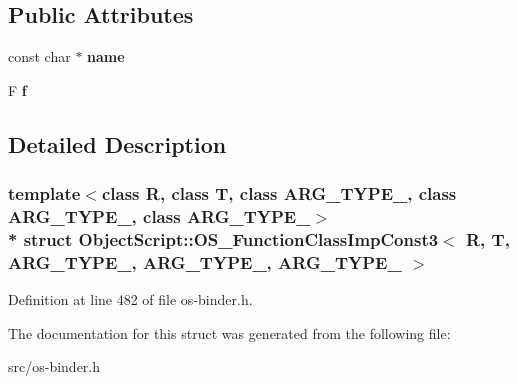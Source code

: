 \subsection*{Public Attributes}
\begin{DoxyCompactItemize}
\item 
const char $\ast$ {\bfseries name}\hypertarget{struct_object_script_1_1_o_s___function_class_imp_const3_a222b6003358fb38b0bf01ca60906c4cc}{}\label{struct_object_script_1_1_o_s___function_class_imp_const3_a222b6003358fb38b0bf01ca60906c4cc}

\item 
F {\bfseries f}\hypertarget{struct_object_script_1_1_o_s___function_class_imp_const3_a1505dd132cf97d86646e6d83f7d48a16}{}\label{struct_object_script_1_1_o_s___function_class_imp_const3_a1505dd132cf97d86646e6d83f7d48a16}

\end{DoxyCompactItemize}


\subsection{Detailed Description}
\subsubsection*{template$<$class R, class T, class A\+R\+G\+\_\+\+T\+Y\+P\+E\+\_, class A\+R\+G\+\_\+\+T\+Y\+P\+E\+\_, class A\+R\+G\+\_\+\+T\+Y\+P\+E\+\_$>$\\*
struct Object\+Script\+::\+O\+S\+\_\+\+Function\+Class\+Imp\+Const3$<$ R, T, A\+R\+G\+\_\+\+T\+Y\+P\+E\+\_, A\+R\+G\+\_\+\+T\+Y\+P\+E\+\_, A\+R\+G\+\_\+\+T\+Y\+P\+E\+\_ $>$}



Definition at line 482 of file os-\/binder.\+h.



The documentation for this struct was generated from the following file\+:\begin{DoxyCompactItemize}
\item 
src/os-\/binder.\+h\end{DoxyCompactItemize}
